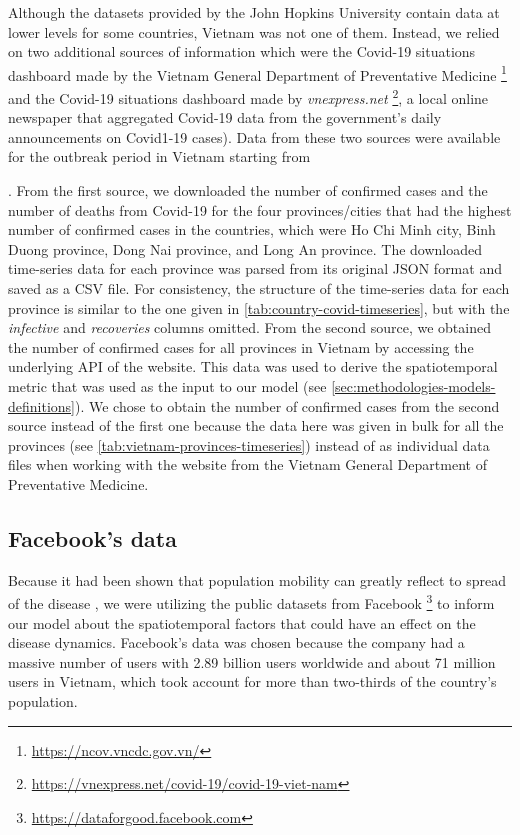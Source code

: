 Although the datasets provided by the John Hopkins University contain data at lower levels for some countries, Vietnam was not one of them.
Instead, we relied on two additional sources of information which were the Covid-19 situations dashboard made by the Vietnam General Department of Preventative Medicine \footnote{\url{https://ncov.vncdc.gov.vn/}} and the Covid-19 situations dashboard made by \textit{vnexpress.net} \footnote{\url{https://vnexpress.net/covid-19/covid-19-viet-nam}}, a local online newspaper that aggregated Covid-19 data from the government's daily announcements on Covid1-19 cases).
Data from these two sources were available for the outbreak period in Vietnam starting from \date{27th April 2021}.
From the first source, we downloaded the number of confirmed cases and the number of deaths from Covid-19 for the four provinces/cities that had the highest number of confirmed cases in the countries, which were Ho Chi Minh city, Binh Duong province, Dong Nai province, and Long An province.
The downloaded time-series data for each province was parsed from its original \gls{JSON} format and saved as a \gls{CSV} file.
For consistency, the structure of the time-series data for each province is similar to the one given in \autoref{tab:country-covid-timeseries}, but with the \textit{infective} and \textit{recoveries} columns omitted.
From the second source, we obtained the number of confirmed cases for all provinces in Vietnam by accessing the underlying \gls{API} of the website.
This data was used to derive the spatiotemporal metric that was used as the input to our model (see \autoref{sec:methodologies-models-definitions}).
We chose to obtain the number of confirmed cases from the second source instead of the first one because the data here was given in bulk for all the provinces (see \autoref{tab:vietnam-provinces-timeseries}) instead of as individual data files when working with the website from the Vietnam General Department of Preventative Medicine.

\subsection{Facebook's data}
\label{sec:methodologies-data-mobility-data}

Because it had been shown that population mobility can greatly reflect to spread of the disease \cite{changMobilityNetworkModels2021,liSubstantialUndocumentedInfection2020,ihmecovid-19forecastingteamModelingCOVID19Scenarios2021}, we were utilizing the public datasets from Facebook \footnote{\url{https://dataforgood.facebook.com}} to inform our model about the spatiotemporal factors that could have an effect on the disease dynamics.
Facebook's data was chosen because the company had a massive number of users with 2.89 billion users worldwide and about 71 million users in Vietnam, which took account for more than two-thirds of the country's population.

